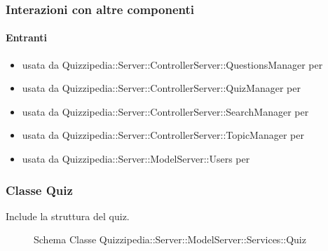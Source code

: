 \subsubsection{Interazioni con altre componenti}
\paragraph{Entranti}
\begin{itemize}
\item usata da Quizzipedia::Server::ControllerServer::QuestionsManager per 
\item usata da Quizzipedia::Server::ControllerServer::QuizManager per 
\item usata da Quizzipedia::Server::ControllerServer::SearchManager per 
\item usata da Quizzipedia::Server::ControllerServer::TopicManager per 
\item usata da Quizzipedia::Server::ModelServer::Users per 
\end{itemize}
\subsubsection{Classe Quiz}
Include la struttura del quiz.
\begin{figure}[H]
\centering
\noindent{}
\caption[Schema Classe Quiz]{Schema Classe Quizzipedia::Server::ModelServer::Services::Quiz}
\end{figure}
